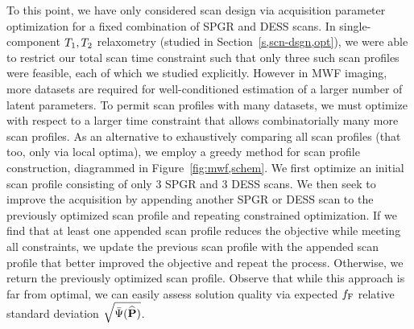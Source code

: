 To this point,
we have only considered scan design
via acquisition parameter optimization
for a fixed combination 
of SPGR and DESS scans.
In single-component $T_1,T_2$ relaxometry
(studied in Section~\ref{s,scn-dsgn,opt}),
we were able to restrict 
our total scan time constraint
such that only three such scan profiles were feasible,
each of which we studied explicitly.
However in MWF imaging,
more datasets are required
for well-conditioned estimation
of a larger number of latent parameters.
To permit scan profiles
with many datasets,
we must optimize with respect
to a larger time constraint
that allows combinatorially many more scan profiles.
As an alternative
to exhaustively comparing all scan profiles
(that too, only via local optima),
we employ a greedy method 
for scan profile construction,
diagrammed in Figure~\ref{fig:mwf,schem}.
We first optimize
an initial scan profile consisting 
of only $3$ SPGR and $3$ DESS scans.
We then seek 
to improve the acquisition 
by appending another SPGR or DESS scan
to the previously optimized scan profile
and repeating constrained optimization.
If we find
that at least one appended scan profile
reduces the objective 
while meeting all constraints,
we update the previous scan profile
with the appended scan profile
that better improved the objective
and repeat the process. 
Otherwise, 
we return the previously optimized scan profile.
Observe that while this approach
is far from optimal,
we can easily assess solution quality 
via expected $f_{\mathrm{F}}$ relative standard deviation 
$\sqrt{\bar{\Psi}(\widehat{\mathbf{P}})}$.

